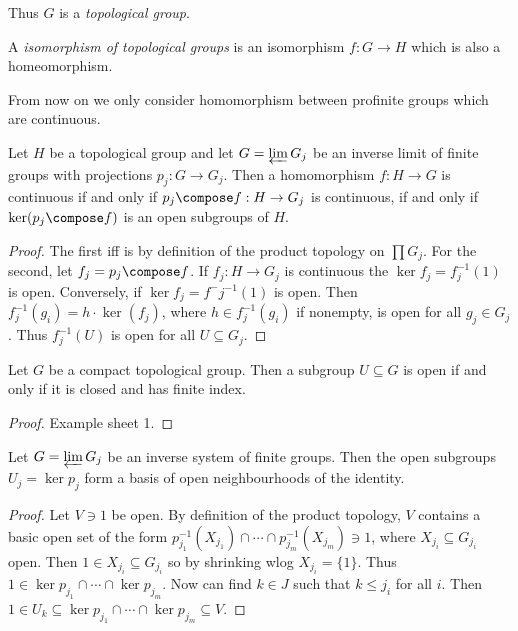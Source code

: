 \documentclass[a4paper]{article}
\begin{document}
Thus \(G\) is a \emph{topological group}.

\begin{definition}
  A \emph{isomorphism of topological groups} is an isomorphism \(f: G \to H\) which is also a homeomorphism.
\end{definition}

From now on we only consider homomorphism between profinite groups which are continuous.

\begin{lemma}
  Let \(H\) be a topological group and let \(G = \varprojlim G_j\) be an inverse limit of finite groups with projections \(p_j: G \to G_j\). Then a homomorphism \(f: H \to G\) is continuous if and only if \(p_j \compose f: H \to G_j\) is continuous, if and only if \(\ker(p_j \compose f)\) is an open subgroups of \(H\).
\end{lemma}

\begin{proof}
  The first iff is by definition of the product topology on \(\prod G_j\). For the second, let \(f_j = p_j \compose f\). If \(f_j: H \to G_j\) is continuous the \(\ker f_j = f_j^{-1}(1)\) is open. Conversely, if \(\ker f_j = f^-j^{-1}(1)\) is open. Then \(f_j^{-1}(g_i) = h \cdot \ker(f_j)\), where \(h \in f_j^{-1}(g_i)\) if nonempty, is open for all \(g_j \in G_j\). Thus \(f_j^{-1}(U)\) is open for all \(U \subseteq G_j\).
\end{proof}

\begin{proposition}
  Let \(G\) be a compact topological group. Then a subgroup \(U \subseteq G\) is open if and only if it is closed and has finite index.
\end{proposition}

\begin{proof}
  Example sheet 1.
\end{proof}

\begin{proposition}
  Let \(G = \varprojlim G_j\) be an inverse system of finite groups. Then the open subgroups \(U_j = \ker p_j\) form a basis of open neighbourhoods of the identity.
\end{proposition}

\begin{proof}
  Let \(V \ni 1\) be open. By definition of the product topology, \(V\) contains a basic open set of the form \(p_{j_1}^{-1}(X_{j_1}) \cap \cdots \cap p_{j_m}^{-1}(X_{j_m}) \ni 1\), where \(X_{j_i} \subseteq G_{j_i}\) open. Then \(1 \in X_{j_i} \subseteq G_{j_i}\) so by shrinking wlog \(X_{j_i} = \{1\}\). Thus \(1 \in \ker p_{j_1} \cap \cdots \cap \ker p_{j_m}\). Now can find \(k \in J\) such that \(k \leq j_i\) for all \(i\). Then \(1 \in U_k \subseteq \ker p_{j_1} \cap \cdots \cap \ker p_{j_m} \subseteq V\).
\end{proof}
\end{document}
